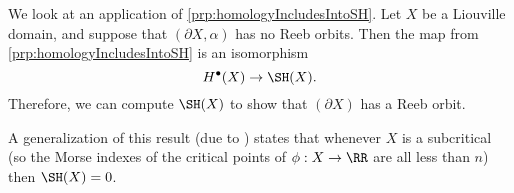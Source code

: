 
\begin{application}
We look at an application of \cref{prp:homologyIncludesIntoSH}. 
Let $X$ be a Liouville domain, and suppose that $(\partial X, \alpha)$ has no Reeb orbits. Then the map from \cref{prp:homologyIncludesIntoSH} is an isomorphism 
\[H^\bullet(X)\to \SH(X).\]
Therefore, we can compute $\SH(X)$ to show that $(\partial X)$ has a Reeb orbit.  



A generalization of this result (due to \cite{oancea2003suite}) states that whenever $X$ is a subcritical   (so the Morse indexes of the critical points of $\phi: X\to \RR$ are all less than $n$) then $\SH(X)=0$. 
\end{application}